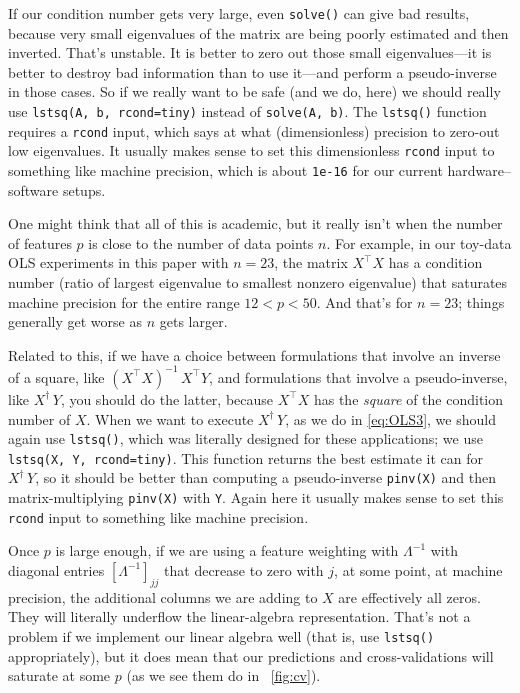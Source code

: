 \documentclass[12pt,letterpaper]{article}
\newcommand{\code}[1]{\texttt{#1}}
\begin{document}
If our condition number gets very large, even \code{solve()} can give bad results, because very small eigenvalues of the matrix are being poorly estimated and then inverted.
That's unstable.
It is better to zero out those small eigenvalues---it is better to destroy bad information than to use it---and perform a pseudo-inverse in those cases.
So if we really want to be safe (and we do, here) we should really use \code{lstsq(A, b, rcond=tiny)} instead of \code{solve(A, b)}.
The \code{lstsq()} function requires a \code{rcond} input, which says at what (dimensionless) precision to zero-out low eigenvalues.
It usually makes sense to set this dimensionless \code{rcond} input to something like machine precision, which is about \code{1e-16} for our current hardware--software setups.

One might think that all of this is academic, but it really isn't when the number of features $p$ is close to the number of data points $n$.
For example, in our toy-data OLS experiments in this paper with $n=23$, the matrix $X^\top X$ has a condition number (ratio of largest eigenvalue to smallest nonzero eigenvalue) that saturates machine precision for the entire range $12 < p < 50$.
And that's for $n=23$; things generally get worse as $n$ gets larger.

Related to this, if we have a choice between formulations that involve an inverse of a square, like $(X^\top X)^{-1}\,X^\top Y$, and formulations that involve a pseudo-inverse, like $X^\dagger\,Y$, you should do the latter, because $X^\top X$ has the \emph{square} of the condition number of $X$.
When we want to execute $X^\dagger\,Y$, as we do in \eqref{eq:OLS3}, we should again use \code{lstsq()}, which was literally designed for these applications; we use \code{lstsq(X, Y, rcond=tiny)}.
This function returns the best estimate it can for $X^\dagger\,Y$, so
it should be better than computing a pseudo-inverse \code{pinv(X)} and then matrix-multiplying \code{pinv(X)} with \code{Y}.
Again here it usually makes sense to set this \code{rcond} input to something like machine precision.

Once $p$ is large enough, if we are using a feature weighting with $\Lambda^{-1}$ with diagonal entries $[\Lambda^{-1}]_{jj}$ that decrease to zero with $j$, at some point, at machine precision, the additional columns we are adding to $X$ are effectively all zeros.
They will literally underflow the linear-algebra representation.
That's not a problem if we implement our linear algebra well (that is, use \code{lstsq()} appropriately), but it does mean that our predictions and cross-validations will saturate at some $p$ (as we see them do in \figurename~\ref{fig:cv}).
\end{document}
